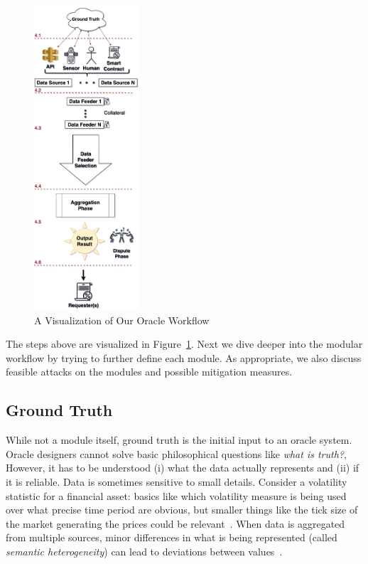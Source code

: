 \begin{figure}[t!]
    \centering
    \includegraphics[width=0.35\textwidth]{figures/data_flow_vertical.png}
    \caption{A Visualization of Our Oracle Workflow}
    \label{fig:dataflow}
\end{figure}	
	
	
	
The steps above are visualized in Figure~\ref{fig:dataflow}. Next we dive deeper into the modular workflow by trying to further define each module. As appropriate, we also discuss feasible attacks on the modules and possible mitigation measures.


\subsection{Ground Truth}\label{ground_truth} 

While not a module itself, ground truth is the initial input to an oracle system. Oracle designers cannot solve basic philosophical questions like \textit{what is truth?}, However, it has to be understood (i) what the data actually represents and (ii) if it is reliable. Data is sometimes sensitive to small details. Consider a volatility statistic for a financial asset: basics like which volatility measure is being used over what precise time period are obvious, but smaller things like the tick size of the market generating the prices could be relevant~\cite{firat2002knowledge}. When data is aggregated from multiple sources, minor differences in what is being represented (called \emph{semantic heterogeneity}) can lead to deviations between values~\cite{madnick2006improving,worboys1991semantic,hakimpour2001resolving}.

